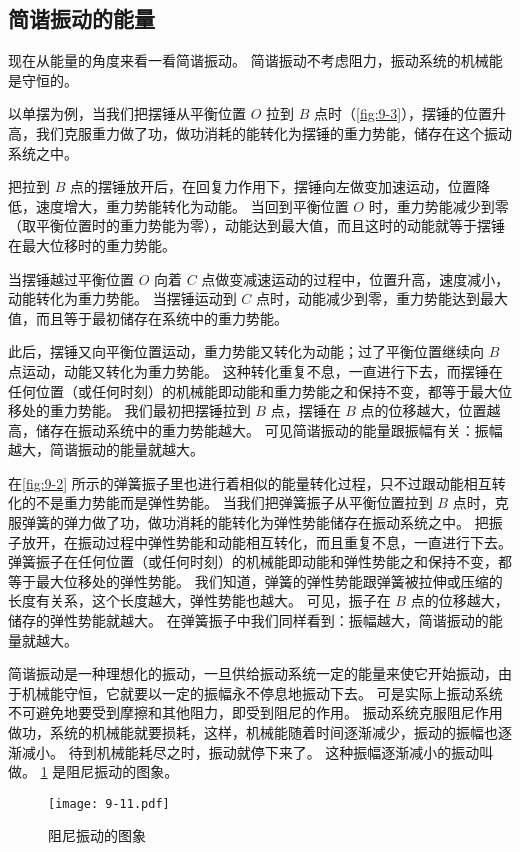 \subsection{简谐振动的能量}
现在从能量的角度来看一看简谐振动。
简谐振动不考虑阻力，振动系统的机械能是守恒的。

以单摆为例，当我们把摆锤从平衡位置 $O$ 拉到 $B$ 点时（\cref{fig:9-3}），摆锤的位置升高，我们克服重力做了功，做功消耗的能转化为摆锤的重力势能，储存在这个振动系统之中。

把拉到 $B$ 点的摆锤放开后，在回复力作用下，摆锤向左做变加速运动，位置降低，速度增大，重力势能转化为动能。
当回到平衡位置 $O$ 时，重力势能减少到零（取平衡位置时的重力势能为零），动能达到最大值，而且这时的动能就等于摆锤在最大位移时的重力势能。

当摆锤越过平衡位置 $O$ 向着 $C$ 点做变减速运动的过程中，位置升高，速度减小，动能转化为重力势能。
当摆锤运动到 $C$ 点时，动能减少到零，重力势能达到最大值，而且等于最初储存在系统中的重力势能。

此后，摆锤又向平衡位置运动，重力势能又转化为动能；过了平衡位置继续向 $B$ 点运动，动能又转化为重力势能。
这种转化重复不息，一直进行下去，而摆锤在任何位置（或任何时刻）的机械能即动能和重力势能之和保持不变，都等于最大位移处的重力势能。
我们最初把摆锤拉到 $B$ 点，摆锤在 $B$ 点的位移越大，位置越高，储存在振动系统中的重力势能越大。
可见简谐振动的能量跟振幅有关：振幅越大，简谐振动的能量就越大。

在\cref{fig:9-2} 所示的弹簧振子里也进行着相似的能量转化过程，只不过跟动能相互转化的不是重力势能而是弹性势能。
当我们把弹簧振子从平衡位置拉到 $B$ 点时，克服弹簧的弹力做了功，做功消耗的能转化为弹性势能储存在振动系统之中。
把振子放开，在振动过程中弹性势能和动能相互转化，而且重复不息，一直进行下去。
弹簧振子在任何位置（或任何时刻）的机械能即动能和弹性势能之和保持不变，都等于最大位移处的弹性势能。
我们知道，弹簧的弹性势能跟弹簧被拉伸或压缩的长度有关系，这个长度越大，弹性势能也越大。
可见，振子在 $B$ 点的位移越大，储存的弹性势能就越大。
在弹簧振子中我们同样看到：振幅越大，简谐振动的能量就越大。

简谐振动是一种理想化的振动，一旦供给振动系统一定的能量来使它开始振动，由于机械能守恒，它就要以一定的振幅永不停息地振动下去。
可是实际上振动系统不可避免地要受到摩擦和其他阻力，即受到阻尼的作用。
振动系统克服阻尼作用做功，系统的机械能就要损耗，这样，机械能随着时间逐渐减少，振动的振幅也逐渐减小。
待到机械能耗尽之时，振动就停下来了。
这种振幅逐渐减小的振动叫做。
\cref{fig:9-11} 是阻尼振动的图象。

\begin{figure}
  \texttt{[image: 9-11.pdf]}
  \caption{阻尼振动的图象}\label{fig:9-11}
\end{figure}

